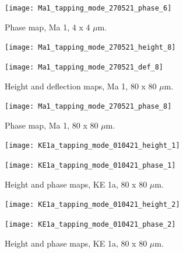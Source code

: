 \begin{figure}[H]
\centering
  \texttt{[image: Ma1\_tapping\_mode\_270521\_phase\_6]}
\caption[Phase map, Ma 1]{Phase map, Ma 1, 4 x 4 $\mu$m.}
\label{fig:afm_ma1_phase_4}
\end{figure}


\begin{figure}[H]
\centering
\begin{minipage}{.45\textwidth}
  \centering
  \texttt{[image: Ma1\_tapping\_mode\_270521\_height\_8]}
\end{minipage}
\begin{minipage}{.45\textwidth}
  \centering
  \texttt{[image: Ma1\_tapping\_mode\_270521\_def\_8]}
\end{minipage}
\caption[Height and deflection maps, Ma 1]{Height and deflection maps, Ma 1, 80 x 80 $\mu$m.}
\label{fig:afm_ma1_height_def_5}
\end{figure}

\begin{figure}[H]
\centering
  \texttt{[image: Ma1\_tapping\_mode\_270521\_phase\_8]}
\caption[Phase map, Ma 1]{Phase map, Ma 1, 80 x 80 $\mu$m.}
\label{fig:afm_ma1_phase_5}
\end{figure}



\begin{figure}[H]
\centering
\begin{minipage}{.45\textwidth}
  \centering
  \texttt{[image: KE1a\_tapping\_mode\_010421\_height\_1]}
\end{minipage}
\begin{minipage}{.45\textwidth}
  \centering
  \texttt{[image: KE1a\_tapping\_mode\_010421\_phase\_1]}
\end{minipage}
\caption[Height and phase maps, KE 1a]{Height and phase maps, KE 1a, 80 x 80 $\mu$m.}
\label{fig:afm_ke1a_height_phase_1}
\end{figure}


\begin{figure}[H]
\centering
\begin{minipage}{.45\textwidth}
  \centering
  \texttt{[image: KE1a\_tapping\_mode\_010421\_height\_2]}
\end{minipage}
\begin{minipage}{.45\textwidth}
  \centering
  \texttt{[image: KE1a\_tapping\_mode\_010421\_phase\_2]}
\end{minipage}
\caption[Height and phase maps, KE 1a]{Height and phase maps, KE 1a, 80 x 80 $\mu$m.}
\label{fig:afm_ke1a_height_phase_2}
\end{figure}


